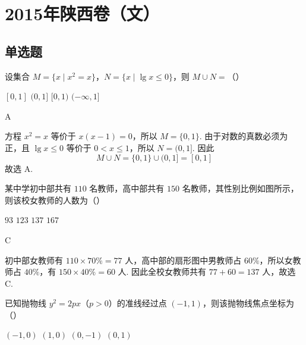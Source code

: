 \chapter{2015年陕西卷（文）}

\section{单选题}

\begin{problem}
设集合 \(M = \{x \mid x^2 = x\}\)，\(N = \{x \mid \lg x \leqslant 0\}\)，则 \(M \cup N =\)（\quad）

\choices
    {\([0,1]\)}
    {\((0,1]\)}
    {\([0,1)\)}
    {\((-\infty,1]\)}
\end{problem}

\begin{answer}
A
\end{answer}

\begin{solution}
方程 \(x^2=x\) 等价于 \(x(x-1)=0\)，所以 \(M=\{0,1\}\). 由于对数的真数必须为正，且 \(\lg x\leqslant0\) 等价于 \(0<x\leqslant1\)，所以 \(N=(0,1]\). 因此
\[
M\cup N=\{0,1\}\cup(0,1]=[0,1]
\]
故选 A.
\end{solution}

\begin{problem}
某中学初中部共有 \(110\text{ 名}\)教师，高中部共有 \(150\text{ 名}\)教师，其性别比例如图所示，则该校女教师的人数为（\quad）


\choices
    {\(93\)}
    {\(123\)}
    {\(137\)}
    {\(167\)}
\end{problem}

\begin{answer}
C
\end{answer}

\begin{solution}
初中部女教师有 \(110\times70\%=77\) 人，高中部的扇形图中男教师占 \(60\%\)，所以女教师占 \(40\%\)，有 \(150\times40\%=60\) 人. 因此全校女教师共有 \(77+60=137\) 人，故选 C.
\end{solution}

\begin{problem}
已知抛物线 \(y^{2}=2px\)（\(p>0\)）的准线经过点 \((-1,1)\)，则该抛物线焦点坐标为（\quad）

\choices
    {\((-1,0)\)}
    {\((1,0)\)}
    {\((0,-1)\)}
    {\((0,1)\)}
\end{problem}

